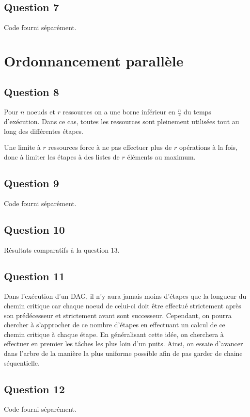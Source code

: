 \documentclass[11pt]{article}
\begin{document}
  \subsection{Question 7}
    Code fourni séparément.

\section{Ordonnancement parallèle}
  \subsection{Question 8}
    Pour $n$ noeuds et $r$ ressources on a une borne inférieur en $\frac{n}{r}$
    du temps d'exécution. Dans ce cas, toutes les ressources sont pleinement
    utilisées tout au long des différentes étapes.

    Une limite à $r$ ressources force à ne pas effectuer plus de $r$ opérations
    à la fois, donc à limiter les étapes à des listes de $r$ éléments au
    maximum.

  \subsection{Question 9}
    Code fourni séparément.

  \subsection{Question 10}
    Résultats comparatifs à la question 13.

  \subsection{Question 11}
    Dans l'exécution d'un DAG, il n'y aura jamais moins d'étapes que la longueur
    du chemin critique car chaque noeud de celui-ci doit être effectué
    strictement après son prédécesseur et strictement avant sont successeur.
    Cependant, on pourra chercher à s'approcher de ce nombre d'étapes en
    effectuant un calcul de ce chemin critique à chaque étape.  En généralisant
    cette idée, on cherchera à effectuer en premier les tâches les plus loin
    d'un puits. Ainsi, on essaie d'avancer dans l'arbre de la manière la plus
    uniforme possible afin de pas garder de chaine séquentielle.

  \subsection{Question 12}
    Code fourni séparément.
\end{document}
